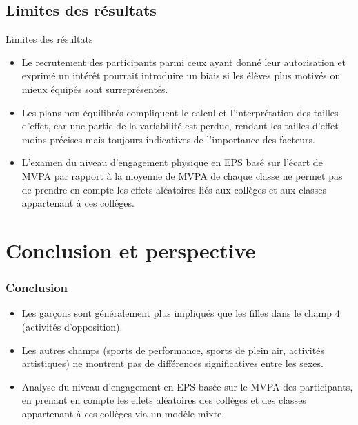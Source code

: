 \documentclass{beamer}
\begin{document}
	\subsection{Limites des résultats}
	\begin{frame}{Limites des résultats}
		\begin{itemize}
			\item Le recrutement des participants parmi ceux ayant donné leur autorisation et exprimé un intérêt pourrait introduire un biais si les élèves plus motivés ou mieux équipés sont surreprésentés.
			\vfill
			\pause
			\item Les plans non équilibrés compliquent le calcul et l'interprétation des tailles d'effet, car une partie de la variabilité est perdue, rendant les tailles d'effet moins précises mais toujours indicatives de l'importance des facteurs.
			\vfill
			\pause
			\item L'examen du niveau d'engagement physique en EPS basé sur l'écart de MVPA par rapport à la moyenne de MVPA de chaque classe ne permet pas de prendre en compte les effets aléatoires liés aux collèges et aux classes appartenant à ces collèges.
		\end{itemize}
	\end{frame}

	
	\section{Conclusion et perspective}
	\begin{frame}
		\frametitle{Conclusion}
		\begin{itemize}
			\item Les garçons sont généralement plus impliqués que les filles dans le champ 4 (activités d'opposition).
			\vfill
			\item Les autres champs (sports de performance, sports de plein air, activités artistiques) ne montrent pas de différences significatives entre les sexes.
			\vfill
			\item Analyse du niveau d'engagement en EPS basée sur le MVPA des participants, en prenant en compte les effets aléatoires des collèges et des classes appartenant à ces collèges via un modèle mixte.
		\end{itemize}
	\end{frame}
	
\end{document}

